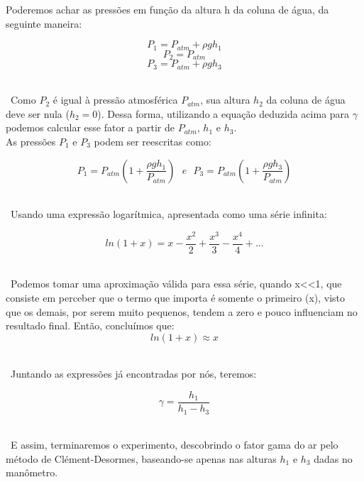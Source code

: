 Poderemos achar as pressões em função da altura h da coluna de água, da seguinte maneira:

\[ P_1 = P_{atm} + \rho g h_1 \]
\[ P_2 = P_{atm} \]
\[ P_3 = P_{atm} + \rho g h_3 \] \


\ Como $P_2$ é igual à pressão atmosférica $P_{atm}$, sua altura $h_2$ da coluna de água deve ser nula ($h_2 = 0 $). Dessa forma, utilizando a equação deduzida acima para $\gamma$ podemos calcular esse fator a partir de $P_{atm}$, $h_1$ e $h_3$.\\

As pressões $P_1$ e $P_3$ podem ser reescritas como:

\[ P_1 = P_{atm} ( 1 + \frac{\rho g h_1}{P_{atm}}) \ \ \  e \ \ \   P_3 = P_{atm} ( 1 + \frac{\rho g h_3}{P_{atm}})   \] \
 
\ Usando uma expressão logarítmica, apresentada como uma série infinita:

\[ ln(1 + x) = x - \frac{x^2}{2} + \frac{x^3}{3} - \frac{x^4}{4} + ...  \]\ 
 
\ Podemos tomar uma aproximação válida para essa série, quando x<<1, que consiste em perceber que o termo que importa é somente o primeiro (x), visto que os demais, por serem muito pequenos, tendem a zero e pouco influenciam no resultado final. Então, concluímos que:
\[ ln(1 + x) \approx x \] \

\ Juntando as expressões já encontradas por nós, teremos:

\[ \gamma = \frac{h_1}{h_1 - h_3} \] \ 

\ E assim, terminaremos o experimento, descobrindo o fator gama do ar pelo método de Clément-Desormes, baseando-se apenas nas alturas $h_1$ e $h_3$ dadas no manômetro.
